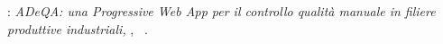 \clearpage
{}
\thispagestyle{empty}

\hfill
\vfill

\noindent\myName: \textit{ADeQA: una \textit{Progressive Web App} per il controllo qualità manuale in filiere produttive industriali,}
\myDegree,
\textcopyright\ \myTime.
